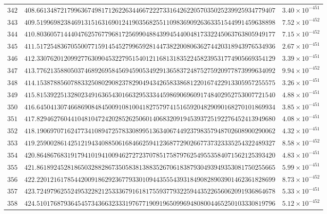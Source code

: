 \documentclass[12pt,reqno]{amsart}
\theoremstyle{remark}
\begin{document}
\begin{longtable}{clc}
$342$ & $408.6613487217996367498171262263446672227331642622057035025239925934779407$ & $3.40\times 10^{-451}$ \\
$343$ & $409.5199698238469131516316901241903568255110983690926363351544991459638898$ & $7.52\times 10^{-452}$ \\
$344$ & $410.8036057144404762576779681725699048843994544004817332245063763805949177$ & $7.15\times 10^{-452}$ \\
$345$ & $411.5172548367055007715914545279965928144738220080636274420318943976534936$ & $2.67\times 10^{-451}$ \\
$346$ & $412.3307620120992776309045322795154012116813183522458239531774905669354129$ & $3.39\times 10^{-451}$ \\
$347$ & $413.7762135880503746892695845694590534929136583724875275920977873999634092$ & $9.94\times 10^{-452}$ \\
$348$ & $414.1538788560788332508029082378290494342658338681220167422913305957255575$ & $3.26\times 10^{-451}$ \\
$349$ & $415.8153922513280234916365430166329533344598690696091748402952753007721540$ & $4.88\times 10^{-451}$ \\
$350$ & $416.6450413074668690848450091081004182757974151659204829090168270101869934$ & $3.85\times 10^{-451}$ \\
$351$ & $417.8294627604410481047242028526250601406832091945393725192276452413949680$ & $4.08\times 10^{-451}$ \\
$352$ & $418.1906970716247734108947257833089951363406744923798357948702608900290062$ & $4.32\times 10^{-451}$ \\
$353$ & $419.2590028614251219434088506168466259412368772902667737323335254322489327$ & $8.58\times 10^{-452}$ \\
$354$ & $420.8648676831917941019410094627272370785175879762549553584071562125393420$ & $4.83\times 10^{-451}$ \\
$355$ & $421.8618924528186503288286735058381388352670618387930493949353081750255665$ & $5.99\times 10^{-451}$ \\
$356$ & $422.2201216178544200918629236779330109443555439318490828903901462361828699$ & $8.73\times 10^{-452}$ \\
$357$ & $423.7249796255249532282125333679161817559377932259443522656062091936864678$ & $5.33\times 10^{-451}$ \\
$358$ & $424.5101768793645457343663233319767719091965099694808004465250103330819796$ & $5.12\times 10^{-452}$ \\

\end{longtable}
\end{document}
